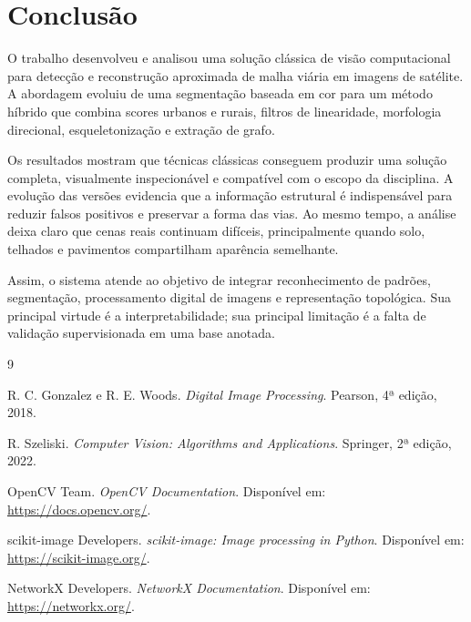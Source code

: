 \documentclass[12pt,a4paper]{article}
\begin{document}
\section{Conclusão}

O trabalho desenvolveu e analisou uma solução clássica de visão computacional para detecção e reconstrução aproximada de malha viária em imagens de satélite. A abordagem evoluiu de uma segmentação baseada em cor para um método híbrido que combina scores urbanos e rurais, filtros de linearidade, morfologia direcional, esqueletonização e extração de grafo.

Os resultados mostram que técnicas clássicas conseguem produzir uma solução completa, visualmente inspecionável e compatível com o escopo da disciplina. A evolução das versões evidencia que a informação estrutural é indispensável para reduzir falsos positivos e preservar a forma das vias. Ao mesmo tempo, a análise deixa claro que cenas reais continuam difíceis, principalmente quando solo, telhados e pavimentos compartilham aparência semelhante.

Assim, o sistema atende ao objetivo de integrar reconhecimento de padrões, segmentação, processamento digital de imagens e representação topológica. Sua principal virtude é a interpretabilidade; sua principal limitação é a falta de validação supervisionada em uma base anotada.

\begin{thebibliography}{9}

R. C. Gonzalez e R. E. Woods.
\textit{Digital Image Processing}.
Pearson, 4ª edição, 2018.

R. Szeliski.
\textit{Computer Vision: Algorithms and Applications}.
Springer, 2ª edição, 2022.

OpenCV Team.
\textit{OpenCV Documentation}.
Disponível em: \url{https://docs.opencv.org/}.

scikit-image Developers.
\textit{scikit-image: Image processing in Python}.
Disponível em: \url{https://scikit-image.org/}.

NetworkX Developers.
\textit{NetworkX Documentation}.
Disponível em: \url{https://networkx.org/}.

\end{thebibliography}
\end{document}
